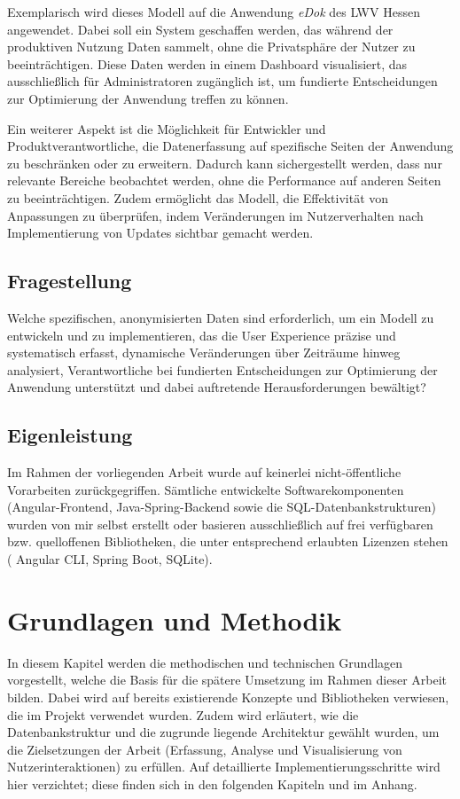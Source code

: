 \documentclass[12pt,oneside]{article}
\begin{document}
Exemplarisch wird dieses Modell auf die Anwendung \textit{eDok} des LWV Hessen angewendet. Dabei soll ein System geschaffen werden, das während der produktiven Nutzung Daten sammelt, ohne die Privatsphäre der Nutzer zu beeinträchtigen. Diese Daten werden in einem Dashboard visualisiert, das ausschließlich für Administratoren zugänglich ist, um fundierte Entscheidungen zur Optimierung der Anwendung treffen zu können.

Ein weiterer Aspekt ist die Möglichkeit für Entwickler und Produktverantwortliche, die Datenerfassung auf spezifische Seiten der Anwendung zu beschränken oder zu erweitern. Dadurch kann sichergestellt werden, dass nur relevante Bereiche beobachtet werden, ohne die Performance auf anderen Seiten zu beeinträchtigen. Zudem ermöglicht das Modell, die Effektivität von Anpassungen zu überprüfen, indem Veränderungen im Nutzerverhalten nach Implementierung von Updates sichtbar gemacht werden.

\subsection{Fragestellung}

Welche spezifischen, anonymisierten Daten sind erforderlich, um ein Modell zu entwickeln und zu implementieren, das die User Experience präzise und systematisch erfasst, dynamische Veränderungen über Zeiträume hinweg analysiert, Verantwortliche bei fundierten Entscheidungen zur Optimierung der Anwendung unterstützt und dabei auftretende Herausforderungen bewältigt?
\subsection{Eigenleistung}
Im Rahmen der vorliegenden Arbeit wurde auf keinerlei nicht-öffentliche Vorarbeiten zurückgegriffen. Sämtliche entwickelte Softwarekomponenten (Angular-Frontend, Java-Spring-Backend sowie die SQL-Datenbankstrukturen) wurden von mir selbst erstellt oder basieren ausschließlich auf frei verfügbaren bzw. quelloffenen Bibliotheken, die unter entsprechend erlaubten Lizenzen stehen ( Angular CLI, Spring Boot, SQLite).

\section{Grundlagen und Methodik}
In diesem Kapitel werden die methodischen und technischen Grundlagen vorgestellt, welche die Basis für die spätere Umsetzung im Rahmen dieser Arbeit bilden. Dabei wird auf bereits existierende Konzepte und Bibliotheken verwiesen, die im Projekt verwendet wurden. Zudem wird erläutert, wie die Datenbankstruktur und die zugrunde liegende Architektur gewählt wurden, um die Zielsetzungen der Arbeit (Erfassung, Analyse und Visualisierung von Nutzerinteraktionen) zu erfüllen. Auf detaillierte Implementierungsschritte wird hier verzichtet; diese finden sich in den folgenden Kapiteln und im Anhang.
\end{document}
